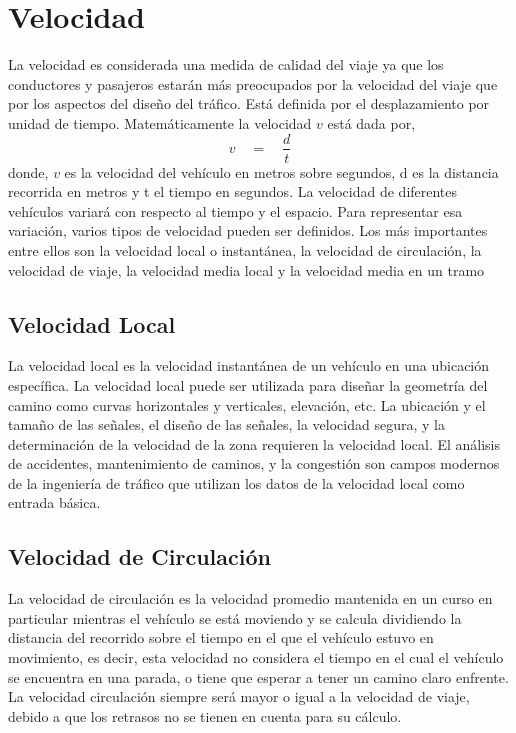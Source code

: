 \section{Velocidad}

La velocidad es considerada una medida de calidad del viaje ya que los conductores y pasajeros estarán más preocupados por la velocidad del viaje que por los aspectos del diseño del tráfico. Está definida por el desplazamiento por unidad de tiempo. Matemáticamente la velocidad $v$ está dada por,
\begin{equation}
v\quad =\quad \frac { d }{ t }
\end{equation}
donde, $v$ es la velocidad del vehículo en metros sobre segundos, d es la distancia recorrida en metros y t el tiempo en segundos. La velocidad de diferentes vehículos variará con respecto al tiempo y el espacio. Para representar esa variación, varios tipos de velocidad pueden ser definidos. Los más importantes entre ellos son la velocidad local o instantánea, la velocidad de circulación, la velocidad de viaje, la velocidad media local y la velocidad media en un tramo \cite{may1990fundamentals}

\subsection{Velocidad Local}

La velocidad local es la velocidad instantánea de un vehículo en una ubicación específica. La velocidad local puede ser utilizada para diseñar la geometría del camino como curvas horizontales y verticales, elevación, etc. La ubicación y el tamaño de las señales, el diseño de las señales, la velocidad segura, y la determinación de la velocidad de la zona requieren la velocidad local. El análisis de accidentes, mantenimiento de caminos, y la congestión son campos modernos de la ingeniería de tráfico que utilizan los datos de la velocidad local como entrada básica. 

\subsection{Velocidad de Circulación}

La velocidad de circulación es la velocidad promedio mantenida en un curso en particular mientras el vehículo se está moviendo y se calcula dividiendo la distancia del recorrido sobre el tiempo en el que el vehículo estuvo en movimiento, es decir, esta velocidad no considera el tiempo en el cual el vehículo se encuentra en una parada, o tiene que esperar a tener un camino claro enfrente. La velocidad circulación siempre será mayor o igual a la velocidad de viaje, debido a que los retrasos no se tienen en cuenta para su cálculo.

